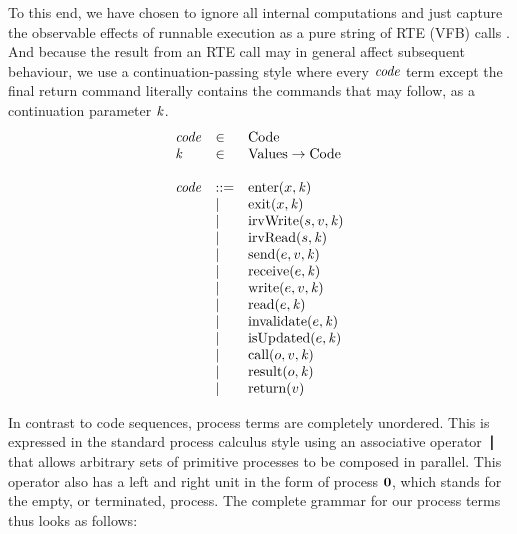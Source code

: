 \documentclass[10pt,conference]{IEEEtran}
\begin{document}
To this end, we have chosen to ignore all internal computations and just capture the observable effects of runnable execution as a pure string of RTE (VFB) calls \cite[ch.~5.6]{AR:RTE}. And because the result from an RTE call may in general affect subsequent behaviour, we use a continuation-passing style \cite{Reynolds93} where every $\Code$ term except the final return command literally contains the commands that may follow, as a continuation parameter $\Cont$.
%
\[
\begin{array}{lll}
  \Code & \in & \text{Code}                \\
  \Cont & \in & \text{Values} \rightarrow \text{Code}   \\ \\
  \Code & ::= & \Enter x \Cont               \\
        & |   & \Exit x \Cont                \\
        & |   & \IrvWrite s v \Cont          \\
        & |   & \IrvRead s \Cont             \\
        & |   & \Send e v \Cont      \\
        & |   & \Receive e \Cont     \\
        & |   & \Write e v \Cont     \\
        & |   & \Read e \Cont        \\
        & |   & \Invalidate e \Cont  \\
        & |   & \IsUpdated e \Cont   \\
        & |   & \Call o v \Cont      \\
        & |   & \Result o \Cont      \\
        & |   & \Return v                    \\
\end{array}
\]

In contrast to code sequences, process terms are completely unordered. This is expressed in the standard process calculus style using an associative operator $\Tpar{}{}$ that allows arbitrary sets of primitive processes to be composed in parallel. This operator also has a left and right unit in the form of process $\textbf{0}$, which stands for the empty, or terminated, process. The complete grammar for our process terms thus looks as follows:
\end{document}
